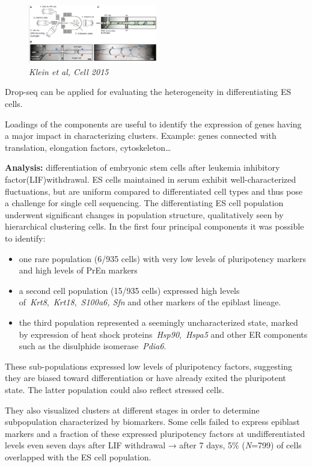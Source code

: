\begin{figure}
\centering
\includegraphics[width=0.5\textwidth]{images/Screen_Shot_2023-02-21_at_20-02-42.png}
\caption{\emph{Klein et al, Cell 2015}}
\end{figure}

Drop-seq can be applied for evaluating the heterogeneity in
differentiating ES cells.

Loadings of the components are useful to identify the expression of
genes having a major impact in characterizing clusters. Example: genes
connected with translation, elongation factors, cytoskeleton\ldots{}

\textbf{Analysis:} differentiation of embryonic stem cells after
leukemia inhibitory factor(LIF)withdrawal. ES cells maintained in serum
exhibit well-characterized fluctuations, but are uniform compared to
differentiated cell types and thus pose a challenge for single cell
sequencing. The differentiating ES cell population underwent significant
changes in population structure, qualitatively seen by hierarchical
clustering cells. In the first four principal components it was possible
to identify:

\begin{itemize}
\tightlist
\item
  one rare population (6/935 cells) with very low levels of pluripotency
  markers and high levels of PrEn markers
\item
  a second cell population (15/935 cells) expressed high levels
  of~\emph{Krt8},~\emph{Krt18},~\emph{S100a6, Sfn} and other markers of
  the epiblast lineage.
\item
  the third population represented a seemingly uncharacterized state,
  marked by expression of heat shock proteins~\emph{Hsp90},~\emph{Hspa5}
  and other ER components such as the disulphide isomerase~\emph{Pdia6}.
\end{itemize}

These sub-populations expressed low levels of pluripotency factors,
suggesting they are biased toward differentiation or have already exited
the pluripotent state. The latter population could also reflect stressed
cells.

They also visualized clusters at different stages in order to determine
subpopulation characterized by biomarkers. Some cells failed to express
epiblast markers and a fraction of these expressed pluripotency factors
at undifferentiated levels even seven days after LIF withdrawal → after
7 days, 5\% (\emph{N}=799) of cells overlapped with the ES cell
population.

